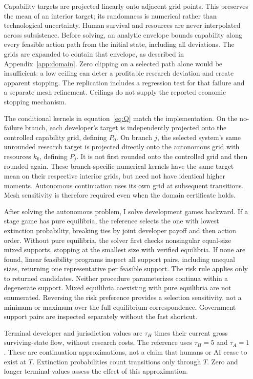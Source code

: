 Capability targets are projected linearly onto adjacent grid points. This preserves the mean of an interior target; its randomness is numerical rather than technological uncertainty. Human survival and resources are never interpolated across subsistence. Before solving, an analytic envelope bounds capability along every feasible action path from the initial state, including all deviations. The grids are expanded to contain that envelope, as described in Appendix~\ref{app:domain}. Zero clipping on a selected path alone would be insufficient: a low ceiling can deter a profitable research deviation and create apparent stopping. The replication includes a regression test for that failure and a separate mesh refinement. Ceilings do not supply the reported economic stopping mechanism.

The conditional kernels in equation~\eqref{eq:Q} match the implementation. On the no-failure branch, each developer's target is independently projected onto the controlled capability grid, defining $P_0$. On branch $j$, the selected system's same unrounded research target is projected directly onto the autonomous grid with resources $k_0$, defining $P_j$. It is not first rounded onto the controlled grid and then rounded again. These branch-specific numerical kernels have the same target mean on their respective interior grids, but need not have identical higher moments. Autonomous continuation uses its own grid at subsequent transitions. Mesh sensitivity is therefore required even when the domain certificate holds.

After solving the autonomous problem, I solve development games backward. If a stage game has pure equilibria, the reference selects the one with lowest extinction probability, breaking ties by joint developer payoff and then action order. Without pure equilibria, the solver first checks nonsingular equal-size mixed supports, stopping at the smallest size with verified equilibria. If none are found, linear feasibility programs inspect all support pairs, including unequal sizes, returning one representative per feasible support. The risk rule applies only to returned candidates. Neither procedure parameterizes continua within a degenerate support. Mixed equilibria coexisting with pure equilibria are not enumerated. Reversing the risk preference provides a selection sensitivity, not a minimum or maximum over the full equilibrium correspondence. Government support pairs are inspected separately without the fast shortcut.

Terminal developer and jurisdiction values are $\tau_H$ times their current gross surviving-state flow, without research costs. The reference uses $\tau_H=5$ and $\tau_A=1$. These are continuation approximations, not a claim that humans or AI cease to exist at $T$. Extinction probabilities count transitions only through $T$. Zero and longer terminal values assess the effect of this approximation.

